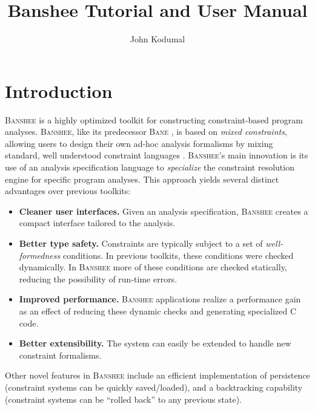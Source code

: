 \documentclass{article}
\title{Banshee Tutorial and User Manual}
\author{John Kodumal}
\newcommand{\bane}{\textsc{Bane}}
\newcommand{\banshee}{\textsc{Banshee}}
\begin{document}
\maketitle

\section{Introduction}

\banshee{} is a highly optimized toolkit for constructing
constraint-based program analyses. \banshee{}, like its predecessor
\bane{} \cite{aiken:tic98}, is based on \emph{mixed constraints},
allowing users to design their own ad-hoc analysis formalisms by
mixing standard, well understood constraint languages
\cite{aiken:sas97}. \banshee{}'s main innovation is its use of an
analysis specification language to \emph{specialize} the constraint
resolution engine for specific program analyses. This approach yields
several distinct advantages over previous toolkits:
\begin{itemize}
\item \textbf{Cleaner user interfaces.} Given an analysis
  specification, \banshee{} creates a compact interface tailored to
  the analysis.
\item \textbf{Better type safety.} Constraints are typically subject
  to a set of \emph{well-formedness} conditions. In previous toolkits,
  these conditions were checked dynamically. In \banshee{} more of
  these conditions are checked statically, reducing the possibility of
  run-time errors.
\item \textbf{Improved performance.} \banshee{} applications realize a
  performance gain as an effect of reducing these dynamic checks and
  generating specialized C code.
\item \textbf{Better extensibility.} The system can easily be extended
  to handle new constraint formalisms.
\end{itemize}

Other novel features in \banshee{} include an efficient implementation
of persistence (constraint systems can be quickly saved/loaded), and a
backtracking capability (constraint systems can be ``rolled back'' to
any previous state).
\end{document}
